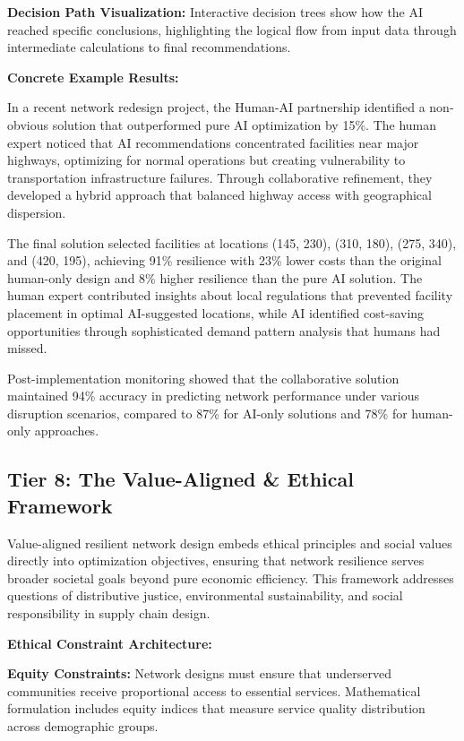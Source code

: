 \documentclass{article}
\begin{document}
\textbf{Decision Path Visualization:} Interactive decision trees show how the AI reached specific conclusions, highlighting the logical flow from input data through intermediate calculations to final recommendations.

\textbf{Concrete Example Results:}

In a recent network redesign project, the Human-AI partnership identified a non-obvious solution that outperformed pure AI optimization by 15\%. The human expert noticed that AI recommendations concentrated facilities near major highways, optimizing for normal operations but creating vulnerability to transportation infrastructure failures. Through collaborative refinement, they developed a hybrid approach that balanced highway access with geographical dispersion.

The final solution selected facilities at locations (145, 230), (310, 180), (275, 340), and (420, 195), achieving 91\% resilience with 23\% lower costs than the original human-only design and 8\% higher resilience than the pure AI solution. The human expert contributed insights about local regulations that prevented facility placement in optimal AI-suggested locations, while AI identified cost-saving opportunities through sophisticated demand pattern analysis that humans had missed.

Post-implementation monitoring showed that the collaborative solution maintained 94\% accuracy in predicting network performance under various disruption scenarios, compared to 87\% for AI-only solutions and 78\% for human-only approaches.

\subsection{Tier 8: The Value-Aligned \& Ethical Framework}

Value-aligned resilient network design embeds ethical principles and social values directly into optimization objectives, ensuring that network resilience serves broader societal goals beyond pure economic efficiency. This framework addresses questions of distributive justice, environmental sustainability, and social responsibility in supply chain design.

\textbf{Ethical Constraint Architecture:}

\textbf{Equity Constraints:} Network designs must ensure that underserved communities receive proportional access to essential services. Mathematical formulation includes equity indices that measure service quality distribution across demographic groups.
\end{document}
